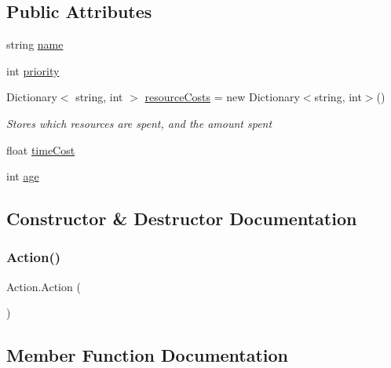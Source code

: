 \subsection*{Public Attributes}
\begin{DoxyCompactItemize}
\item 
string \mbox{\hyperlink{class_action_a3f620f4d21284b95ed2eac1319467747}{name}}
\item 
int \mbox{\hyperlink{class_action_a77b619eb64443ae5f2b729a85a7d7207}{priority}}
\item 
Dictionary$<$ string, int $>$ \mbox{\hyperlink{class_action_afb7d5f622f869e401fcb9edd5961b2fe}{resource\+Costs}} = new Dictionary$<$string, int$>$()
\begin{DoxyCompactList}\small\item\em Stores which resources are spent, and the amount spent \end{DoxyCompactList}\item 
float \mbox{\hyperlink{class_action_a56a4045ce411430256a399031b32ead6}{time\+Cost}}
\item 
int \mbox{\hyperlink{class_action_a04d8b5a2d29dd0b215af21be1a644ac0}{age}}
\end{DoxyCompactItemize}


\subsection{Constructor \& Destructor Documentation}
\mbox{\label{class_action_aed886910937b93b956b61cff7be572bc}} 
\subsubsection{\texorpdfstring{Action()}{Action()}}
{\footnotesize\ttfamily Action.\+Action (\begin{DoxyParamCaption}{ }\end{DoxyParamCaption})}



\subsection{Member Function Documentation}
\mbox{\label{class_action_a6217cfff19f5f6f7e0638f4dd777864b}} 
